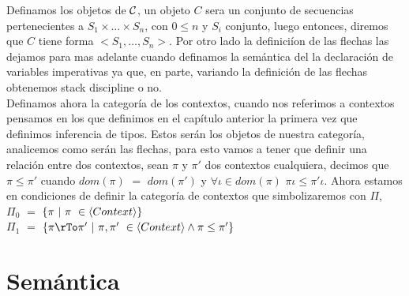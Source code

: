 Definamos los objetos de $\mathcal{C}$, un objeto $C$ sera un conjunto de secuencias 
pertenecientes a $S_1 \times \ldots \times S_n$, con $0 \leq n$ y $S_i$ conjunto, 
luego entonces, diremos que $C$ tiene forma $<S_1,\ldots,S_n>$. Por otro lado
la definici\'ion de las flechas las dejamos para mas adelante cuando definamos 
la sem\'antica del la declaraci\'on de variables imperativas ya que, en parte,
variando la definici\'on de las flechas obtenemos stack discipline o no.\\

Definamos ahora la categor\'ia de los contextos, cuando nos referimos a contextos
pensamos en los que definimos en el cap\'itulo anterior la primera vez que definimos
inferencia de tipos. Estos ser\'an los objetos de nuestra categor\'ia, analicemos
como ser\'an las flechas, para esto vamos a tener que definir una relaci\'on
entre dos contextos, sean $\pi$ y $\pi'$ dos contextos cualquiera, decimos que 
$\pi \leq \pi'$ cuando $dom(\pi)$ $=$ $dom(\pi')$ y $\forall \iota \in dom(\pi)$ 
$\pi \iota \leq \pi' \iota$. Ahora estamos en condiciones de definir la 
categor\'ia de contextos que simbolizaremos con $\Pi$,\\

\noindent 
$\Pi_0$ $=$ $\{\pi \ | \ \pi \ \in \langle Context \rangle \}$\\
$\Pi_1$ $=$ $\{\pi \rTo \pi' \ | \ \pi,\pi' \ \in \lrangles{Context} \wedge \pi \leq \pi' \}$\\



\section{Sem\'antica}

